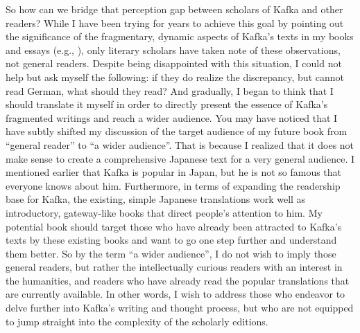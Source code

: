 \documentclass{article}
\begin{document}
So how can we bridge that perception gap between scholars of Kafka and
other readers? While I have been trying for years to achieve this goal by pointing
out the significance of the fragmentary, dynamic aspects of Kafka's
texts in my books and essays (e.g., \cite{myojo_atarashii_2002}), only literary scholars
have taken note of these observations, not general readers. Despite
being disappointed with this situation, I could not help but ask myself
the following: if they do realize the discrepancy, but cannot read
German, what should they read? And gradually, I began to think that I
should translate it myself in order to directly present the essence of
Kafka's fragmented writings and reach a wider audience. You may have noticed that I have subtly shifted my discussion of the target audience of my future book from ``general reader'' to ``a wider audience''. That is because I realized that it does not
make sense to create a comprehensive Japanese text for a very general
audience. I mentioned earlier that Kafka is popular in Japan, but he is
not so famous that everyone knows about him. Furthermore, in terms of
expanding the readership base for Kafka, the existing, simple Japanese
translations work well as introductory, gateway-like books that
direct people's attention to him. My potential book should target those
who have already been attracted to Kafka's texts by these existing books
and want to go one step further and understand them better. So by the
term ``a wider audience'', I do not wish to imply those general readers,
but rather the intellectually curious readers with an interest in the
humanities, and readers who have already read the popular translations
that are currently available. In other words, I wish to address those
who endeavor to delve further into Kafka's writing and thought process,
but who are not equipped to jump straight into the complexity of the
scholarly editions.
\end{document}
